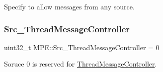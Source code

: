 Specify to allow messages from any source. \mbox{\label{namespace_m_p_e_a6874547713c4758aae159fa87c365d8e}} 
\subsubsection{\texorpdfstring{Src\+\_\+\+Thread\+Message\+Controller}{Src\_ThreadMessageController}}
{\footnotesize\ttfamily uint32\+\_\+t M\+P\+E\+::\+Src\+\_\+\+Thread\+Message\+Controller = 0\hspace{0.3cm}{\ttfamily [static]}}

Soruce 0 is reserved for \hyperlink{class_m_p_e_1_1_thread_message_controller}{Thread\+Message\+Controller}. 